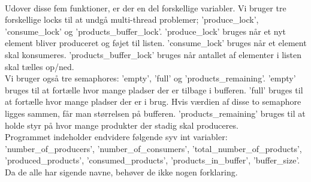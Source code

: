 {\\Udover disse fem funktioner, er der en del forskellige variabler. Vi bruger tre forskellige locks til at undgå multi-thread problemer; 'produce_lock', 'consume_lock' og 'products_buffer_lock'. 'produce_lock' bruges når et nyt element bliver produceret og føjet til listen. 'consume_lock' bruges når et element skal konsumeres. 'products_buffer_lock' bruges når antallet af elementer i listen skal tælles op/ned.
\\Vi bruger også tre semaphores: 'empty', 'full' og 'products_remaining'. 'empty' bruges til at fortælle hvor mange pladser der er tilbage i bufferen. 'full' bruges til at fortælle hvor mange pladser der er i brug. Hvis værdien af disse to semaphore ligges sammen, får man størrelsen på bufferen. 'products_remaining' bruges til at holde styr på hvor mange produkter der stadig skal produceres.
\\Programmet indeholder endvidere følgende syv int variabler: 'number_of_producers', 'number_of_consumers', 'total_number_of_products', 'produced_products', 'consumed_products', 'products_in_buffer', 'buffer_size'. Da de alle har sigende navne, behøver de ikke nogen forklaring.

}
